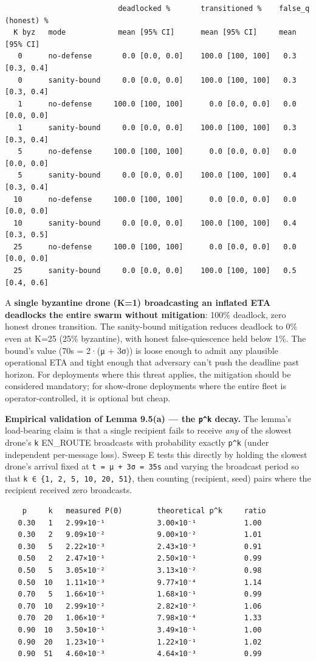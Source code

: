 \begin{verbatim}
                          deadlocked %       transitioned %    false_q (honest) %
  K byz   mode            mean [95% CI]      mean [95% CI]     mean [95% CI]
   0      no-defense       0.0 [0.0, 0.0]    100.0 [100, 100]   0.3 [0.3, 0.4]
   0      sanity-bound     0.0 [0.0, 0.0]    100.0 [100, 100]   0.3 [0.3, 0.4]
   1      no-defense     100.0 [100, 100]      0.0 [0.0, 0.0]   0.0 [0.0, 0.0]
   1      sanity-bound     0.0 [0.0, 0.0]    100.0 [100, 100]   0.3 [0.3, 0.4]
   5      no-defense     100.0 [100, 100]      0.0 [0.0, 0.0]   0.0 [0.0, 0.0]
   5      sanity-bound     0.0 [0.0, 0.0]    100.0 [100, 100]   0.4 [0.3, 0.4]
  10      no-defense     100.0 [100, 100]      0.0 [0.0, 0.0]   0.0 [0.0, 0.0]
  10      sanity-bound     0.0 [0.0, 0.0]    100.0 [100, 100]   0.4 [0.3, 0.5]
  25      no-defense     100.0 [100, 100]      0.0 [0.0, 0.0]   0.0 [0.0, 0.0]
  25      sanity-bound     0.0 [0.0, 0.0]    100.0 [100, 100]   0.5 [0.4, 0.6]
\end{verbatim}

A \textbf{single byzantine drone (K=1) broadcasting an inflated ETA
deadlocks the entire swarm without mitigation}: 100\% deadlock, zero
honest drones transition. The sanity-bound mitigation reduces deadlock
to 0\% even at K=25 (25\% byzantine), with honest false-quiescence held
below 1\%. The bound's value (70s = 2·(μ + 3σ)) is loose enough to admit
any plausible operational ETA and tight enough that adversary can't push
the deadline past horizon. For deployments where this threat applies,
the mitigation should be considered mandatory; for show-drone
deployments where the entire fleet is operator-controlled, it is
optional but cheap.

\textbf{Empirical validation of Lemma 9.5(a) --- the \texttt{p\^{}k}
decay.} The lemma's load-bearing claim is that a single recipient fails
to receive \emph{any} of the slowest drone's \texttt{k} EN\_ROUTE
broadcasts with probability exactly \texttt{p\^{}k} (under independent
per-message loss). Sweep E tests this directly by holding the slowest
drone's arrival fixed at \texttt{t\ =\ μ\ +\ 3σ\ =\ 35s} and varying the
broadcast period so that \texttt{k\ ∈\ \{1,\ 2,\ 5,\ 10,\ 20,\ 51\}},
then counting (recipient, seed) pairs where the recipient received zero
broadcasts.

\begin{verbatim}
    p     k   measured P(0)        theoretical p^k     ratio
   0.30   1   2.99×10⁻¹            3.00×10⁻¹           1.00
   0.30   2   9.09×10⁻²            9.00×10⁻²           1.01
   0.30   5   2.22×10⁻³            2.43×10⁻³           0.91
   0.50   2   2.47×10⁻¹            2.50×10⁻¹           0.99
   0.50   5   3.05×10⁻²            3.13×10⁻²           0.98
   0.50  10   1.11×10⁻³            9.77×10⁻⁴           1.14
   0.70   5   1.66×10⁻¹            1.68×10⁻¹           0.99
   0.70  10   2.99×10⁻²            2.82×10⁻²           1.06
   0.70  20   1.06×10⁻³            7.98×10⁻⁴           1.33
   0.90  10   3.50×10⁻¹            3.49×10⁻¹           1.00
   0.90  20   1.23×10⁻¹            1.22×10⁻¹           1.02
   0.90  51   4.60×10⁻³            4.64×10⁻³           0.99
\end{verbatim}

